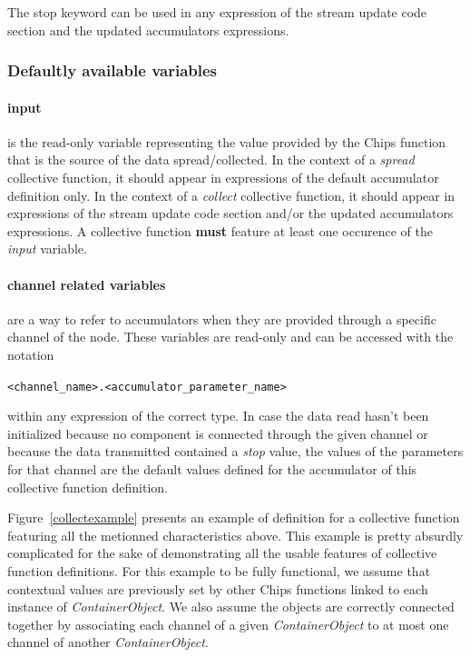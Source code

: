 \documentclass{article}
\begin{document}
The stop keyword can be used in any expression of the stream update code section and the updated accumulators expressions.

\subsubsection{Defaultly available variables}
\paragraph{input} is the read-only variable representing the value provided by the Chips function that is the source of the data spread/collected. In the context of a \emph{spread} collective function, it should appear in expressions of the default accumulator definition only. In the context of a \emph{collect} collective function, it should appear in expressions of the stream update code section and/or the updated accumulators expressions. A collective function \textbf{must} feature at least one occurence of the \emph{input} variable.

\paragraph{channel related variables} are a way to refer to accumulators when they are provided through a specific channel of the node. These variables are read-only and can be accessed with the notation
\begin{center}
    \verb'<channel_name>.<accumulator_parameter_name>'
\end{center}
within any expression of the correct type. In case the data read hasn't been initialized because no component is connected through the given channel or because the data transmitted contained a \emph{stop} value, the values of the parameters for that channel are the default values defined for the accumulator of this collective function definition.

Figure~\ref{collectexample} presents an example of definition for a collective function featuring all the metionned characteristics above. This example is pretty absurdly complicated for the sake of demonstrating all the usable features of collective function definitions. For this example to be fully functional, we assume that contextual values are previously set by other Chips functions linked to each instance of \emph{ContainerObject}. We also assume the objects are correctly connected together by associating each channel of a given \emph{ContainerObject} to at most one channel of another \emph{ContainerObject}.
\end{document}
